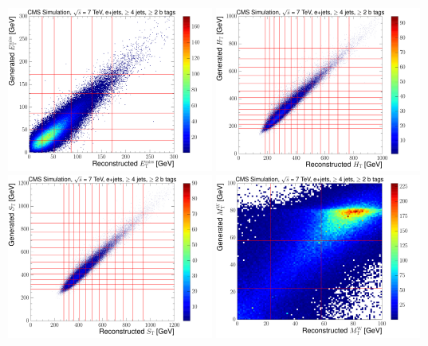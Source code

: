 \begin{figure}[hbtp]
	\centering
     \includegraphics[width=0.48\textwidth]{Chapters/07_08_09_Analysis/Images/binning/electron_MET_7TeV}\hfill
     \includegraphics[width=0.48\textwidth]{Chapters/07_08_09_Analysis/Images/binning/electron_HT_7TeV}\\
     \includegraphics[width=0.48\textwidth]{Chapters/07_08_09_Analysis/Images/binning/electron_ST_7TeV}\hfill
     \includegraphics[width=0.48\textwidth]{Chapters/07_08_09_Analysis/Images/binning/electron_MT_7TeV}\\

\end{figure}
